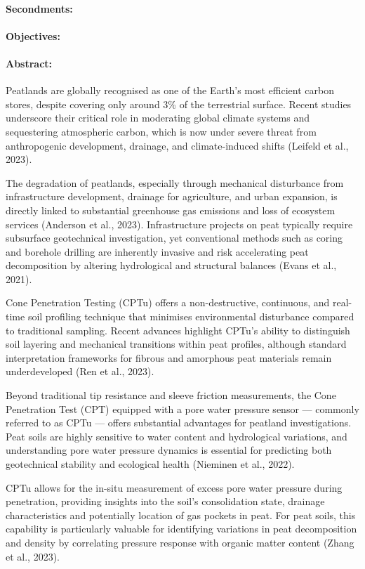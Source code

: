 \documentclass[12pt]{article}
\begin{document}
\paragraph{Secondments:} 
\paragraph{Objectives:} 
\paragraph{Abstract:} Peatlands are globally recognised as one of the Earth’s most efficient carbon stores, despite covering only around 3\% of the terrestrial surface. Recent studies underscore their critical role in moderating global climate systems and sequestering atmospheric carbon, which is now under severe threat from anthropogenic development, drainage, and climate-induced shifts (Leifeld et al., 2023).

The degradation of peatlands, especially through mechanical disturbance from infrastructure development, drainage for agriculture, and urban expansion, is directly linked to substantial greenhouse gas emissions and loss of ecosystem services (Anderson et al., 2023). Infrastructure projects on peat typically require subsurface geotechnical investigation, yet conventional methods such as coring and borehole drilling are inherently invasive and risk accelerating peat decomposition by altering hydrological and structural balances (Evans et al., 2021).

Cone Penetration Testing (CPTu) offers a non-destructive, continuous, and real-time soil profiling technique that minimises environmental disturbance compared to traditional sampling. Recent advances highlight CPTu’s ability to distinguish soil layering and mechanical transitions within peat profiles, although standard interpretation frameworks for fibrous and amorphous peat materials remain underdeveloped (Ren et al., 2023).

Beyond traditional tip resistance and sleeve friction measurements, the Cone Penetration Test (CPT) equipped with a pore water pressure sensor — commonly referred to as CPTu — offers substantial advantages for peatland investigations. Peat soils are highly sensitive to water content and hydrological variations, and understanding pore water pressure dynamics is essential for predicting both geotechnical stability and ecological health (Nieminen et al., 2022).

CPTu allows for the in-situ measurement of excess pore water pressure during penetration, providing insights into the soil’s consolidation state, drainage characteristics and potentially location of gas pockets in peat. For peat soils, this capability is particularly valuable for identifying variations in peat decomposition and density by correlating pressure response with organic matter content (Zhang et al., 2023).
\end{document}
